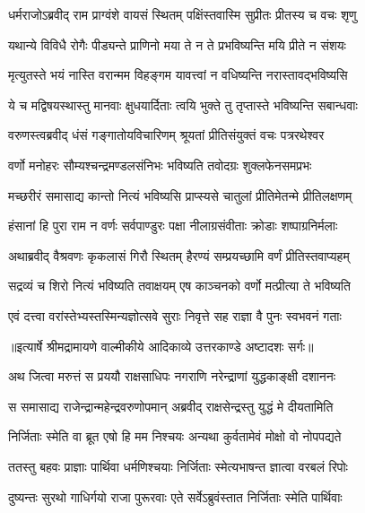 \twolineshloka
{धर्मराजोऽब्रवीद् राम प्राग्वंशे वायसं स्थितम्}
{पक्षिंस्तवास्मि सुप्रीतः प्रीतस्य च वचः शृणु} %

\twolineshloka
{यथान्ये विविधै रोगैः पीड्यन्ते प्राणिनो मया}
{ते न ते प्रभविष्यन्ति मयि प्रीते न संशयः} %

\twolineshloka
{मृत्युतस्ते भयं नास्ति वरान्मम विहङ्गम}
{यावत्त्वां न वधिष्यन्ति नरास्तावद्भविष्यसि} %

\twolineshloka
{ये च मद्विषयस्थास्तु मानवाः क्षुधयार्दिताः}
{त्वयि भुक्ते तु तृप्तास्ते भविष्यन्ति सबान्धवाः} %

\twolineshloka
{वरुणस्त्वब्रवीद् धंसं गङ्गातोयविचारिणम्}
{श्रूयतां प्रीतिसंयुक्तं वचः पत्ररथेश्वर} %

\twolineshloka
{वर्णो मनोहरः सौम्यश्चन्द्रमण्डलसंनिभः}
{भविष्यति तवोदग्रः शुक्लफेनसमप्रभः} %

\twolineshloka
{मच्छरीरं समासाद्य कान्तो नित्यं भविष्यसि}
{प्राप्स्यसे चातुलां प्रीतिमेतन्मे प्रीतिलक्षणम्} %

\twolineshloka
{हंसानां हि पुरा राम न वर्णः सर्वपाण्डुरः}
{पक्षा नीलाग्रसंवीताः क्रोडाः शष्पाग्रनिर्मलाः} %

\twolineshloka
{अथाब्रवीद् वैश्रवणः कृकलासं गिरौ स्थितम्}
{हैरण्यं सम्प्रयच्छामि वर्णं प्रीतिस्तवाप्यहम्} %

\twolineshloka
{सद्रव्यं च शिरो नित्यं भविष्यति तवाक्षयम्}
{एष काञ्चनको वर्णो मत्प्रीत्या ते भविष्यति} %

\twolineshloka
{एवं दत्त्वा वरांस्तेभ्यस्तस्मिन्यज्ञोत्सवे सुराः}
{निवृत्ते सह राज्ञा वै पुनः स्वभवनं गताः} %


{॥इत्यार्षे श्रीमद्रामायणे वाल्मीकीये आदिकाव्ये उत्तरकाण्डे अष्टादशः सर्गः॥}


\twolineshloka
{अथ जित्वा मरुत्तं स प्रययौ राक्षसाधिपः}
{नगराणि नरेन्द्राणां युद्धकाङ्क्षी दशाननः} %

\twolineshloka
{स समासाद्य राजेन्द्रान्महेन्द्रवरुणोपमान्}
{अब्रवीद् राक्षसेन्द्रस्तु युद्धं मे दीयतामिति} %

\twolineshloka
{निर्जिताः स्मेति वा ब्रूत एषो हि मम निश्चयः}
{अन्यथा कुर्वतामेवं मोक्षो वो नोपपद्यते} %

\twolineshloka
{ततस्तु बहवः प्राज्ञाः पार्थिवा धर्मणिश्चयाः}
{निर्जिताः स्मेत्यभाषन्त ज्ञात्वा वरबलं रिपोः} %

\twolineshloka
{दुष्यन्तः सुरथो गाधिर्गयो राजा पुरूरवाः}
{एते सर्वेऽब्रुवंस्तात निर्जिताः स्मेति पार्थिवाः} %

